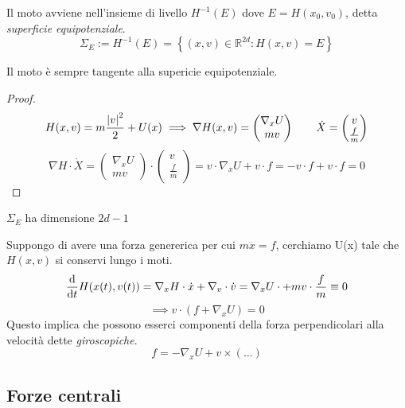 Il moto avviene nell'insieme di livello $H^{-1}(E)$ dove $E = H(x_0,v_0)$, detta \textit{superficie equipotenziale}.
\begin{equation}
    \Sigma_E:= H^{-1}(E)=\left\{ (x,v) \in \mathbb{R}^{2d}:H(x,v)=E  \right\} 
\end{equation}

\begin{proposition}
    Il moto è sempre tangente alla supericie equipotenziale.
\end{proposition}
\begin{proof}
    \begin{equation*}
        H(x,v)= m\frac{\abs{v}^2}{2}+U(x) \implies 
        \nabla H(x,v)= 
        \begin{pmatrix}
            \nabla_xU\\mv 
        \end{pmatrix}
        \qquad \dot{X}= 
        \begin{pmatrix}
            v\\\frac{f}{m}
        \end{pmatrix}
    \end{equation*}
    \begin{equation*}
        \nabla H \cdot \dot{X}=  
        \begin{pmatrix}
            \nabla_xU\\mv 
        \end{pmatrix} \cdot
        \begin{pmatrix}
            v\\\frac{f}{m}
        \end{pmatrix}
        = v\cdot\nabla_xU +v\cdot f = -v \cdot f +v\cdot f = 0 
    \end{equation*}
\end{proof}

\begin{remark}
    $\Sigma_E $ ha dimensione $2d-1$
\end{remark}

Suppongo di avere una forza genererica per cui $m\ddot{x}= f $, cerchiamo U(x) tale che $H(x,v)$ si conservi lungo i moti.
\begin{equation*}
    \dv{}{t}H(x(t),v(t))= \nabla_xH\cdot\dot{x}+\nabla_v\cdot\dot{v}= \nabla_xU\cdot + mv\cdot \frac{f}{m}\equiv0
\end{equation*}
\begin{equation}
    \implies v \cdot \left( f + \nabla_xU \right)=0
\end{equation}
Questo implica che possono esserci componenti della forza perpendicolari alla velocità dette \textit{giroscopiche}.
\begin{equation}
    f= -\nabla_xU + v\times (\dots)
\end{equation}

\subsection{Forze centrali}
